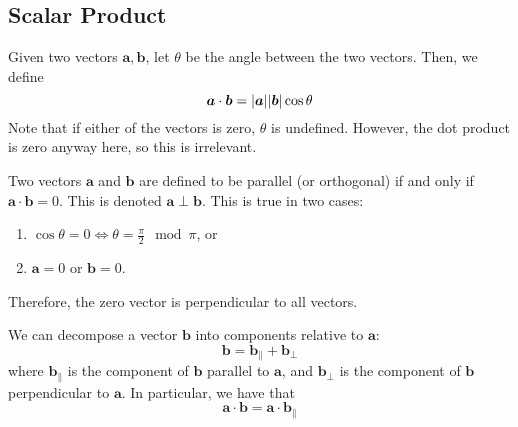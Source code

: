 \documentclass{article}
\begin{document}
\subsection{Scalar Product}
\begin{definition}
	Given two vectors $\bm a, \bm b$, let $\theta$ be the angle between the two vectors. Then, we define
	\[ \bm a \cdot \bm b = \abs{\bm a} \abs{\bm b} \cos \theta \]
	Note that if either of the vectors is zero, $\theta$ is undefined. However, the dot product is zero anyway here, so this is irrelevant.
\end{definition}
\begin{definition}
	Two vectors $\bm a$ and $\bm b$ are defined to be parallel (or orthogonal) if and only if $\bm a \cdot \bm b = 0$. This is denoted $\bm a \perp \bm b$. This is true in two cases:
	\begin{enumerate}
		\item $\cos \theta = 0 \iff \theta = \frac{\pi}{2} \mod \pi$, or
		\item $\bm a = 0$ or $\bm b = 0$.
	\end{enumerate}
	Therefore, the zero vector is perpendicular to all vectors.
\end{definition}
\begin{definition}
	We can decompose a vector $\bm b$ into components relative to $\bm a$:
	\[ \bm b = \bm b_\parallel + \bm b_\perp \]
	where $\bm b_\parallel$ is the component of $\bm b$ parallel to $\bm a$, and $\bm b_\perp$ is the component of $\bm b$ perpendicular to $\bm a$. In particular, we have that
	\[ \bm a \cdot \bm b = \bm a \cdot \bm b_\parallel \]
\end{definition}
\end{document}
